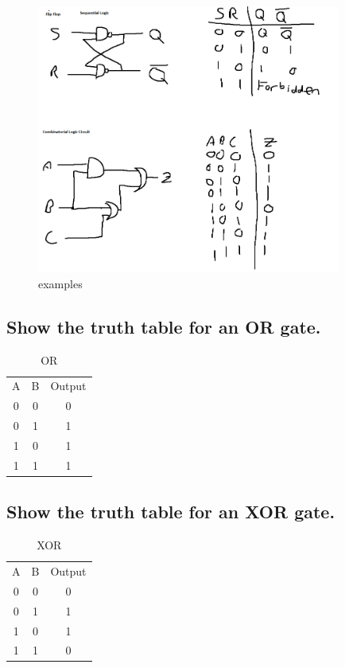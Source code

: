 \documentclass{article}
\begin{document}
\begin{figure}[h]
    \centering
    \includegraphics[width=100mm]{digitalLogic.PNG}
    \caption{examples}
    \label{fig:my_label}
\end{figure}

\subsection{Show the truth table for an OR gate.}
\begin{table}[h]
    \centering
    \begin{tabular}{|c|c|c|}
        A & B & Output \\
        0 & 0 & 0\\
        0 & 1 & 1\\
        1 & 0 & 1\\
        1 & 1 & 1\\
    \end{tabular}
    \caption{OR}
    \label{tab:my_label}
\end{table}

\subsection{Show the truth table for an XOR gate.}
\begin{table}[h]
    \centering
    \begin{tabular}{|c|c|c|}
        A & B & Output \\
        0 & 0 & 0\\
        0 & 1 & 1\\
        1 & 0 & 1\\
        1 & 1 & 0\\
    \end{tabular}
    \caption{XOR}
    \label{tab:my_label}
\end{table}
\end{document}
